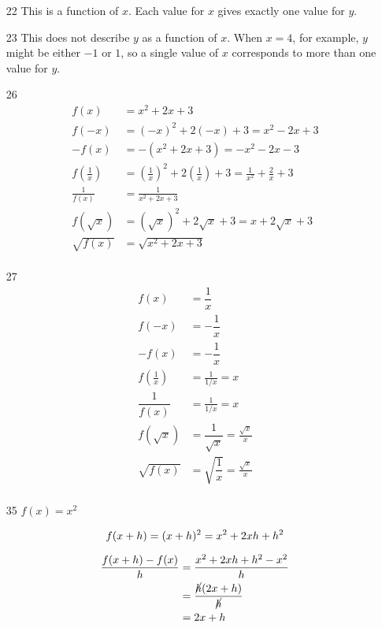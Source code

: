 \documentclass[fleqn,addpoints]{exam}
\begin{document}
\begin{itemize}
\item[22]
This is a function of $x$.  Each value for $x$ gives exactly one value for $y$.

\item[23]
This does not describe $y$ as a function of $x$.  When $x=4$, for example, $y$ might be either $-1$ or $1$, so a single
value of $x$ corresponds to more than one value for $y$. 

\item[26]
\begin{align*}
  f(x) &= x^2 + 2x + 3 \\
  f(-x) &= (-x)^2 + 2(-x) + 3  = x^2 - 2x + 3\\
  -f(x) &= -(x^2 + 2x + 3) = -x^2 - 2x - 3 \\
  f\left( \frac{1}{x} \right) &= \left( \frac{1}{x} \right)^2 + 2 \left( \frac{1}{x} \right) + 3 
      = \frac{1}{x^2} + \frac{2}{x} + 3 \\
  \frac{1}{f(x)} &= \frac{1}{x^2 + 2x + 3} \\
  f(\sqrt{x}) &= (\sqrt{x})^2 + 2\sqrt{x} + 3 = x + 2 \sqrt{x} + 3 \\
  \sqrt{f(x)} &= \sqrt{x^2 + 2x + 3} \\
\end{align*}

\item[27]
\begin{align*}
  f(x)  &= \dfrac{1}{x} \\
  f(-x) &= - \dfrac{1}{x} \\
  -f(x) &= - \dfrac{1}{x} \\
  f\left( \frac{1}{x} \right) &= \frac{1}{1/x} = x \\
  \dfrac{1}{f(x)} &= \frac{1}{1/x} = x \\
  f(\sqrt{x}) &= \dfrac{1}{\sqrt{x}} = \frac{\sqrt{x}}{x} \\
  \sqrt{f(x)} &= \sqrt{\dfrac{1}{x}} = \frac{\sqrt{x}}{x} \\
\end{align*}

\item[35]
  $f(x) = x^2$

\[
f(x+h) = (x + h)^2  = x^2 + 2xh + h^2 \\
\]

\begin{align*}
  \frac{f(x+h) - f(x)}{h} &= \frac{x^2 + 2xh + h^2 - x^2}{h} \\
  &= \frac{\cancel{h}(2x + h)}{\cancel{h}} \\
  &= 2x + h \\
\end{align*}


\end{itemize}
\end{document}
